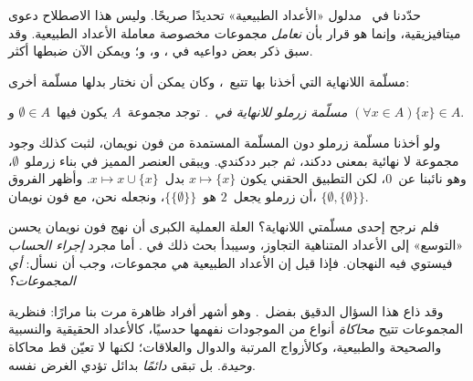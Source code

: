 \documentclass[../../../include/open-logic-section]{subfiles}
\begin{document}
	


حدّدنا في~ مدلول «الأعداد الطبيعية»
تحديدًا صريحًا. وليس هذا الاصطلاح دعوى ميتافيزيقية، وإنما هو قرار بأن
\emph{نعامل} مجموعات مخصوصة معاملة الأعداد الطبيعية. وقد سبق ذكر بعض
دواعيه في
، و،
و؛ ويمكن الآن ضبطها أكثر.

مسلّمة اللانهاية التي أخذنا بها تتبع~\citet{VonNeumann1925}، وكان
يمكن أن نختار بدلها مسلّمة أخرى:

\begin{defish}
\emph{مسلّمة زرملو للانهاية في~\citeyear{Zermelo1908Untersuchungen}.}
توجد مجموعة~$A$ يكون فيها~$\emptyset \in A$ و
$(\forall x \in A)\{x\} \in A$.
\end{defish}

ولو أخذنا مسلّمة زرملو دون المسلّمة المستمدة من فون نويمان، لثبت كذلك
وجود مجموعة لا نهائية بمعنى ددكند، ثم جبر ددكندي. ويبقى العنصر المميز
في بناء زرملو~$\emptyset$، وهو نائبنا عن~$0$، لكن التطبيق الحقني يكون
$x \mapsto \{x\}$ بدل~$x \mapsto x \cup \{x\}$. وأظهر الفروق أن
زرملو يجعل~$2$ هو~$\{\{\emptyset\}\}$، ونجعله نحن، مع فون نويمان،
$\{\emptyset, \{\emptyset\}\}$.

فلم نرجح إحدى مسلّمتي اللانهاية؟ العلة العملية الكبرى أن نهج فون
نويمان يحسن «التوسع» إلى الأعداد المتناهية التجاوز، وسيبدأ بحث ذلك في
. أما مجرد \emph{إجراء الحساب} فيستوي فيه
النهجان. فإذا قيل إن الأعداد الطبيعية \emph{هي} مجموعات، وجب أن نسأل:
\emph{أي المجموعات؟}

وقد ذاع هذا السؤال الدقيق بفضل~\citet{Benacerraf1965}. وهو أشهر أفراد
ظاهرة مرت بنا مرارًا: فنظرية المجموعات تتيح \emph{محاكاة} أنواع من
الموجودات نفهمها حدسيًا، كالأعداد الحقيقية والنسبية والصحيحة والطبيعية،
وكالأزواج المرتبة والدوال والعلاقات؛ لكنها لا تعيّن قط محاكاة
\emph{وحيدة}. بل تبقى \emph{دائمًا} بدائل تؤدي الغرض نفسه.
\end{document}
